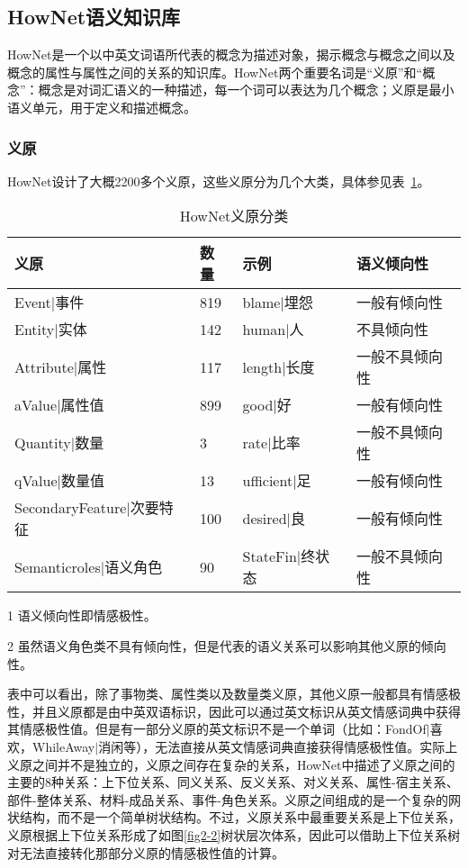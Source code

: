 \subsection{HowNet语义知识库}
HowNet是一个以中英文词语所代表的概念为描述对象，揭示概念与概念之间以及概念的属性与属性之间的关系的知识库。HowNet两个重要名词是“义原”和“概念”：概念是对词汇语义的一种描述，每一个词可以表达为几个概念；义原是最小语义单元，用于定义和描述概念。
\subsubsection{义原} 
HowNet设计了大概2200多个义原，这些义原分为几个大类，具体参见表~\ref{tab2-1}。

\begin{table}[htp]
\centering
\caption{HowNet义原分类}
\label{tab2-1}
\begin{threeparttable}
 \begin{tabular}{|l|l|l|l|}
 \hline
 义原&数量& 示例&语义倾向性\tnote{1}\\
 \hline
 Event$ | $事件& 819& blame$ | $埋怨& 一般有倾向性\\
 \hline
Entity$ | $实体& 142& human$ | $人 & 不具倾向性\\
\hline
Attribute$ | $属性& 117 & length$ | $长度 &一般不具倾向性\\
\hline
aValue$ | $属性值& 899 & good$ | $好 &一般有倾向性\\
\hline
Quantity$ | $数量& 3 & rate$ | $比率 & 一般不具倾向性\\
\hline
qValue$ | $数量值& 13 & ufficient$ | $足 & 一般有倾向性\\
\hline
SecondaryFeature$ | $次要特征& 100 & desired$ | $良&一般有倾向性\\
\hline
Semanticroles$ | $语义角色& 90 & StateFin$ | $终状态 & 一般不具倾向性\tnote{2}\\
 \hline
\end{tabular}
\begin{tablenotes}
  \footnotesize
\item[1]语义倾向性即情感极性。
\item[2]虽然语义角色类不具有倾向性，但是代表的语义关系可以影响其他义原的倾向性。
\end{tablenotes}
\end{threeparttable}
\end{table}

表中可以看出，除了事物类、属性类以及数量类义原，其他义原一般都具有情感极性，并且义原都是由中英双语标识，因此可以通过英文标识从英文情感词典中获得其情感极性值。但是有一部分义原的英文标识不是一个单词（比如：FondOf$ | $喜欢，WhileAway$ | $消闲等），无法直接从英文情感词典直接获得情感极性值。实际上义原之间并不是独立的，义原之间存在复杂的关系，HowNet中描述了义原之间的主要的8种关系：上下位关系、同义关系、反义关系、对义关系、属性-宿主关系、部件-整体关系、材料-成品关系、事件-角色关系。义原之间组成的是一个复杂的网状结构，而不是一个简单树状结构。不过，义原关系中最重要关系是上下位关系，义原根据上下位关系形成了如图\ref{fig2-2}树状层次体系，因此可以借助上下位关系树对无法直接转化那部分义原的情感极性值的计算。

